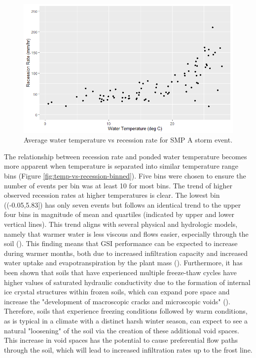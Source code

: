 \begin{figure}[ht]
	\centering
	\includegraphics[width=\textwidth]{gfx/chapter-data-analysis/temperature_vs_recession_rate_by_storm.png}
	\caption{Average water temperature vs recession rate for SMP A storm event.}
	\label{fig:temp-vs-recession-by-storm}
\end{figure}

The relationship between recession rate and ponded water temperature becomes more apparent when temperature is separated into similar temperature range bins (Figure \ref{fig:temp-vs-recession-binned}).
Five bins were chosen to ensure the number of events per bin was at least 10 for most bins.
The trend of higher observed recession rates at higher temperatures is clear.
The lowest bin ((-0.05,5.83]) has only seven events but follows an identical trend to the upper four bins in magnitude of mean and quartiles (indicated by upper and lower vertical lines).
This trend aligns with several physical and hydrologic models, namely that warmer water is less viscous and flows easier, especially through the soil (\cite{Emerson2008}).
This finding means that GSI performance can be expected to increase during warmer months, both due to increased infiltration capacity and increased water uptake and evapotranspiration by the plant mass (\cite{Bartens2008}).
Furthermore, it has been shown that soils that have experienced multiple freeze-thaw cycles have higher values of saturated hydraulic conductivity due to the formation of internal ice crystal structures within frozen soils, which can expand pore space and increase the "development of macroscopic cracks and microscopic voids" (\cite{Asare1999}).
Therefore, soils that experience freezing conditions followed by warm conditions, as is typical in a climate with a distinct harsh winter season, can expect to see a natural "loosening" of the soil via the creation of these additional void spaces.
This increase in void spaces has the potential to cause preferential flow paths through the soil, which will lead to increased infiltration rates up to the frost line.

